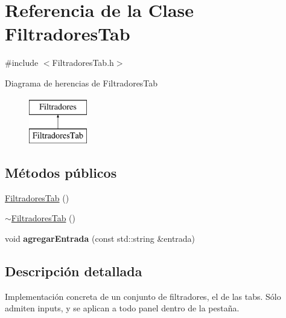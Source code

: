 \hypertarget{classFiltradoresTab}{\section{\-Referencia de la \-Clase \-Filtradores\-Tab}
\label{classFiltradoresTab}
}


{\ttfamily \#include $<$\-Filtradores\-Tab.\-h$>$}

\-Diagrama de herencias de \-Filtradores\-Tab\begin{figure}[H]
\begin{center}
\leavevmode
\includegraphics[height=2.000000cm]{classFiltradoresTab}
\end{center}
\end{figure}
\subsection*{\-Métodos públicos}
\begin{DoxyCompactItemize}
\item 
\hyperlink{classFiltradoresTab_addce817d4d87056260859935f50b1c05}{\-Filtradores\-Tab} ()
\item 
\hyperlink{classFiltradoresTab_a37bb0ad95be5e9f00e9d3f012ce3c5ee}{$\sim$\-Filtradores\-Tab} ()
\item 
\hypertarget{classFiltradoresTab_a3263fde5111452e4943b9611fdd87939}{void {\bfseries agregar\-Entrada} (const std\-::string \&entrada)}\label{classFiltradoresTab_a3263fde5111452e4943b9611fdd87939}

\end{DoxyCompactItemize}


\subsection{\-Descripción detallada}
\-Implementación concreta de un conjunto de filtradores, el de las tabs. \-Sólo admiten inputs, y se aplican a todo panel dentro de la pestaña. 


